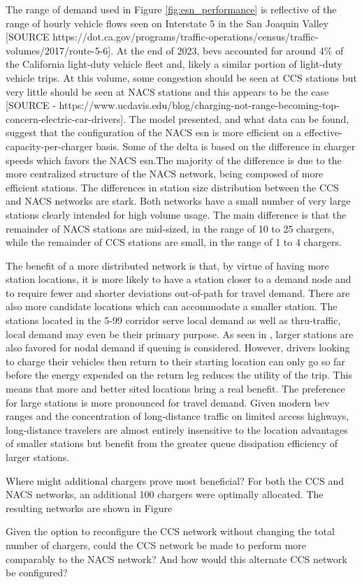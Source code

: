 The range of demand used in Figure \ref{fig:esn_performance} is reflective of the range of hourly vehicle flows seen on Interstate 5 in the San Joaquin Valley [SOURCE https://dot.ca.gov/programs/traffic-operations/census/traffic-volumes/2017/route-5-6]. At the end of 2023, \glspl{bev} accounted for around 4\% of the California light-duty vehicle fleet \citep{cec_2024} and, likely a similar portion of light-duty vehicle trips. At this volume, some congestion should be seen at CCS stations but very little should be seen at NACS stations and this appears to be the case [SOURCE - https://www.ucdavis.edu/blog/charging-not-range-becoming-top-concern-electric-car-drivers]. The model presented, and what data can be found, suggest that the configuration of the NACS \gls{esn} is more efficient on a effective-capacity-per-charger basis. Some of the delta is based on the difference in charger speeds which favors the NACS \gls{esn}.The majority of the difference is due to the more centralized structure of the NACS network, being composed of more efficient stations. The differences in station size distribution between the CCS and NACS networks are stark. Both networks have a small number of very large stations clearly intended for high volume usage. The main difference is that the remainder of NACS stations are mid-sized, in the range of 10 to 25 chargers, while the remainder of CCS stations are small, in the range of 1 to 4 chargers.

The benefit of a more distributed network is that, by virtue of having more station locations, it is more likely to have a station closer to a demand node and to require fewer and shorter deviations out-of-path for travel demand. There are also more candidate locations which can accommodate a smaller station. The stations located in the 5-99 corridor serve local demand as well as thru-traffic, local demand may even be their primary purpose. As seen in \citep{Liu_2023}, larger stations are also favored for nodal demand if queuing is considered. However, drivers looking to charge their vehicles then return to their starting location can only go so far before the energy expended on the return leg reduces the utility of the trip. This means that more and better sited locations bring a real benefit. The preference for large stations is more pronounced for travel demand. Given modern \gls{bev} ranges and the concentration of long-distance traffic on limited access highways, long-distance travelers are almost entirely insensitive to the location advantages of smaller stations but benefit from the greater queue dissipation efficiency of larger stations.

Where might additional chargers prove most beneficial? For both the CCS and NACS networks, an additional 100 chargers were optimally allocated. The resulting networks are shown in Figure

Given the option to reconfigure the CCS network without changing the total number of chargers, could the CCS network be made to perform more comparably to the NACS network? And how would this alternate CCS network be configured?



